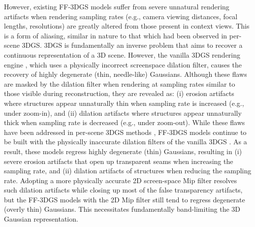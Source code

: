 \documentclass[runningheads]{llncs}
\begin{document}
However, existing FF-3DGS models \cite{chen2024mvsplat, xu2025depthsplat, ye2024no, huang2025no, huang2025spfsplatv2} suffer from severe unnatural rendering artifacts when rendering sampling rates (e.g., camera viewing distances, focal lengths, resolutions) are greatly altered from those present in context views. This is a form of aliasing, similar in nature to that which had been observed in per-scene 3DGS. 3DGS is fundamentally an inverse problem that aims to recover a continuous representation of a 3D scene. However, the vanilla 3DGS rendering engine \cite{kerbl20233d}, which uses a physically incorrect screenspace dilation filter, causes the recovery of highly degenerate (thin, needle-like) Gaussians. Although these flaws are masked by the dilation filter when rendering at sampling rates similar to those visible during reconstruction, they are revealed as: (i) erosion artifacts where structures appear unnaturally thin when sampling rate is increased (e.g., under zoom-in), and (ii) dilation artifacts where structures appear unnaturally thick when sampling rate is decreased (e.g., under zoom-out). While these flaws have been addressed in per-scene 3DGS methods \cite{yu2024mip, younes2025anti, chen2025alias, steiner2025aaa}, FF-3DGS models continue to be built with the physically inaccurate dilation filters of the vanilla 3DGS \cite{kerbl20233d}. As a result, these models regress highly degenerate (thin) Gaussians, resulting in (i) severe erosion artifacts that open up transparent seams when increasing the sampling rate, and (ii) dilation artifacts of structures when reducing the sampling rate. Adopting a more physically accurate 2D screen-space Mip filter \cite{yu2024mip} resolves such dilation artifacts while closing up most of the false transparency artifacts, but the FF-3DGS models with the 2D Mip filter \cite{yu2024mip} still tend to regress degenerate (overly thin) Gaussians. This necessitates fundamentally band-limiting the 3D Gaussian representation.
\end{document}
